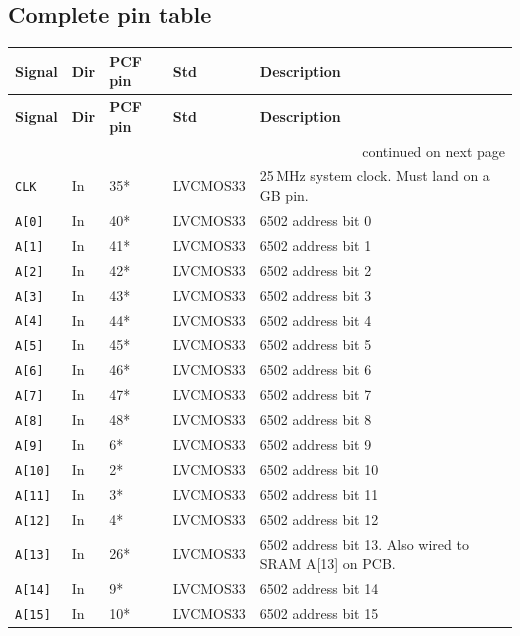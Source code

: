 \documentclass[11pt,a4paper]{article}
\newcommand{\sig}[1]{\texttt{#1}}
\begin{document}
\subsection{Complete pin table}

\begin{center}
\small
\begin{longtable}{llllp{5.5cm}}
\toprule
\textbf{Signal} & \textbf{Dir} & \textbf{PCF pin} & \textbf{Std} &
\textbf{Description} \\
\midrule
\endfirsthead
\toprule
\textbf{Signal} & \textbf{Dir} & \textbf{PCF pin} & \textbf{Std} &
\textbf{Description} \\
\midrule
\endhead
\midrule
\multicolumn{5}{r}{\small continued on next page}\\
\endfoot
\bottomrule
\endlastfoot

\sig{CLK}           & In    & 35* & LVCMOS33 &
    25\,MHz system clock. Must land on a GB pin. \\[2pt]

\sig{A[0]}          & In    & 40* & LVCMOS33 & 6502 address bit 0 \\
\sig{A[1]}          & In    & 41* & LVCMOS33 & 6502 address bit 1 \\
\sig{A[2]}          & In    & 42* & LVCMOS33 & 6502 address bit 2 \\
\sig{A[3]}          & In    & 43* & LVCMOS33 & 6502 address bit 3 \\
\sig{A[4]}          & In    & 44* & LVCMOS33 & 6502 address bit 4 \\
\sig{A[5]}          & In    & 45* & LVCMOS33 & 6502 address bit 5 \\
\sig{A[6]}          & In    & 46* & LVCMOS33 & 6502 address bit 6 \\
\sig{A[7]}          & In    & 47* & LVCMOS33 & 6502 address bit 7 \\
\sig{A[8]}          & In    & 48* & LVCMOS33 & 6502 address bit 8 \\
\sig{A[9]}          & In    &  6* & LVCMOS33 & 6502 address bit 9 \\
\sig{A[10]}         & In    &  2* & LVCMOS33 & 6502 address bit 10 \\
\sig{A[11]}         & In    &  3* & LVCMOS33 & 6502 address bit 11 \\
\sig{A[12]}         & In    &  4* & LVCMOS33 & 6502 address bit 12 \\
\sig{A[13]}         & In    & 26* & LVCMOS33 &
    6502 address bit 13. Also wired to SRAM A[13] on PCB. \\
\sig{A[14]}         & In    &  9* & LVCMOS33 & 6502 address bit 14 \\
\sig{A[15]}         & In    & 10* & LVCMOS33 & 6502 address bit 15 \\[2pt]


\end{longtable}
\end{center}
\end{document}
